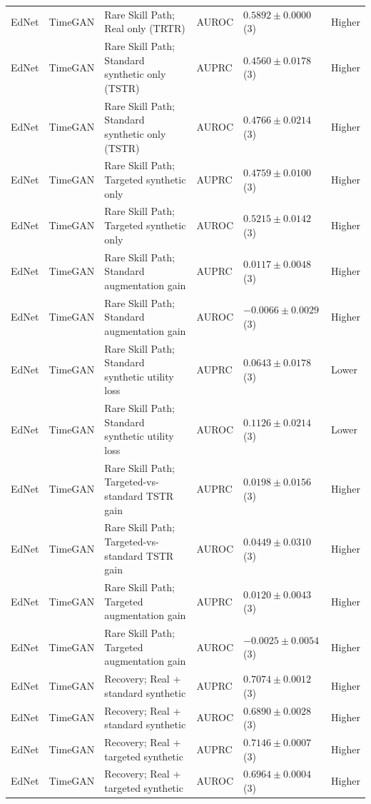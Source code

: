 \begin{longtable}{@{}p{2.25cm}p{2.05cm}p{4.7cm}p{5.0cm}p{2.6cm}p{1.25cm}@{}}
EdNet & TimeGAN & Rare Skill Path; Real only (TRTR) & AUROC & $0.5892 \mathbin{\pm} 0.0000$ (3) & Higher \\
EdNet & TimeGAN & Rare Skill Path; Standard synthetic only (TSTR) & AUPRC & $0.4560 \mathbin{\pm} 0.0178$ (3) & Higher \\
EdNet & TimeGAN & Rare Skill Path; Standard synthetic only (TSTR) & AUROC & $0.4766 \mathbin{\pm} 0.0214$ (3) & Higher \\
EdNet & TimeGAN & Rare Skill Path; Targeted synthetic only & AUPRC & $0.4759 \mathbin{\pm} 0.0100$ (3) & Higher \\
EdNet & TimeGAN & Rare Skill Path; Targeted synthetic only & AUROC & $0.5215 \mathbin{\pm} 0.0142$ (3) & Higher \\
EdNet & TimeGAN & Rare Skill Path; Standard augmentation gain & AUPRC & $0.0117 \mathbin{\pm} 0.0048$ (3) & Higher \\
EdNet & TimeGAN & Rare Skill Path; Standard augmentation gain & AUROC & $-0.0066 \mathbin{\pm} 0.0029$ (3) & Higher \\
EdNet & TimeGAN & Rare Skill Path; Standard synthetic utility loss & AUPRC & $0.0643 \mathbin{\pm} 0.0178$ (3) & Lower \\
EdNet & TimeGAN & Rare Skill Path; Standard synthetic utility loss & AUROC & $0.1126 \mathbin{\pm} 0.0214$ (3) & Lower \\
EdNet & TimeGAN & Rare Skill Path; Targeted-vs-standard TSTR gain & AUPRC & $0.0198 \mathbin{\pm} 0.0156$ (3) & Higher \\
EdNet & TimeGAN & Rare Skill Path; Targeted-vs-standard TSTR gain & AUROC & $0.0449 \mathbin{\pm} 0.0310$ (3) & Higher \\
EdNet & TimeGAN & Rare Skill Path; Targeted augmentation gain & AUPRC & $0.0120 \mathbin{\pm} 0.0043$ (3) & Higher \\
EdNet & TimeGAN & Rare Skill Path; Targeted augmentation gain & AUROC & $-0.0025 \mathbin{\pm} 0.0054$ (3) & Higher \\
EdNet & TimeGAN & Recovery; Real + standard synthetic & AUPRC & $0.7074 \mathbin{\pm} 0.0012$ (3) & Higher \\
EdNet & TimeGAN & Recovery; Real + standard synthetic & AUROC & $0.6890 \mathbin{\pm} 0.0028$ (3) & Higher \\
EdNet & TimeGAN & Recovery; Real + targeted synthetic & AUPRC & $0.7146 \mathbin{\pm} 0.0007$ (3) & Higher \\
EdNet & TimeGAN & Recovery; Real + targeted synthetic & AUROC & $0.6964 \mathbin{\pm} 0.0004$ (3) & Higher \\

\end{longtable}
